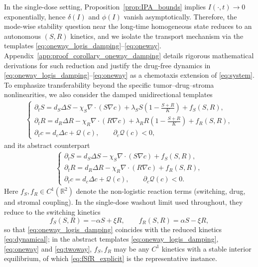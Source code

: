 \documentclass[pdflatex,sn-mathphys-ay]{sn-jnl}
\theoremstyle{thmstyleone}
\theoremstyle{definition}
\theoremstyle{remark}
\begin{document}
In the single-dose setting, Proposition~\ref{prop:IPA_bounds} implies $I(\cdot,t)\to 0$ exponentially, hence $\delta(I)$ and $\phi(I)$ vanish asymptotically. Therefore, the mode-wise stability question near the long-time homogeneous state reduces to an autonomous $(S,R)$ kinetics, and we isolate the transport mechanism via the templates \eqref{eq:oneway_logis_damping}–\eqref{eq:oneway}. Appendix~\ref{app:proof_corollary_oneway_damping} details rigorous mathematical derivations for such reduction and justify the drug-free dynamics in \eqref{eq:oneway_logis_damping}–\eqref{eq:oneway} as a chemotaxis extension of \eqref{eq:system}.
To emphasize transferability beyond the specific tumor--drug--stroma nonlinearities, we also consider the damped unidirectional templates
\begin{align}
\label{eq:oneway_logis_damping}
\begin{cases}
\partial_t S = d_S\Delta S - \chi_S\nabla \cdot (S\nabla c) + \lambda_S S\left(1 - \tfrac{S+R}{K} \right) + f_S(S,R), \\[2pt]
\partial_t R = d_R\Delta R - \chi_R\nabla \cdot (R\nabla c) + \lambda_R R\left(1 - \tfrac{S+R}{K} \right) + f_R(S,R), \\[2pt]
\partial_t c = d_c\Delta c + \mathcal{Q}(c), \qquad \partial_c\mathcal{Q}(c) < 0,
\end{cases}
\end{align}
and its abstract counterpart
\begin{align}
\label{eq:oneway}
\begin{cases}
\partial_t S = d_S\Delta S - \chi_S\nabla \cdot (S\nabla c) + f_S(S,R), \\[2pt]
\partial_t R = d_R\Delta R - \chi_R\nabla \cdot (R\nabla c) + f_R(S,R), \\[2pt]
\partial_t c = d_c\Delta c + \mathcal{Q}(c), \qquad \partial_c\mathcal{Q}(c) < 0.
\end{cases}
\end{align}
Here $f_S,f_R\in C^1(\mathbb R^2)$ denote the non-logistic reaction terms
(switching, drug, and stromal coupling). In the single-dose washout limit used
throughout, they reduce to the switching kinetics
\begin{equation}
\label{eq:fSfR_explicit}
f_S(S,R)=-\alpha S+\xi R,\qquad f_R(S,R)=\alpha S-\xi R,
\end{equation}
so that \eqref{eq:oneway_logis_damping} coincides with the reduced kinetics
\eqref{eq:dynamical}; in the abstract templates
\eqref{eq:oneway_logis_damping}, \eqref{eq:oneway} and \eqref{eq:twoway}, $f_S,f_R$ may be any $C^1$
kinetics with a stable interior equilibrium, of which
\eqref{eq:fSfR_explicit} is the representative instance.
\end{document}

